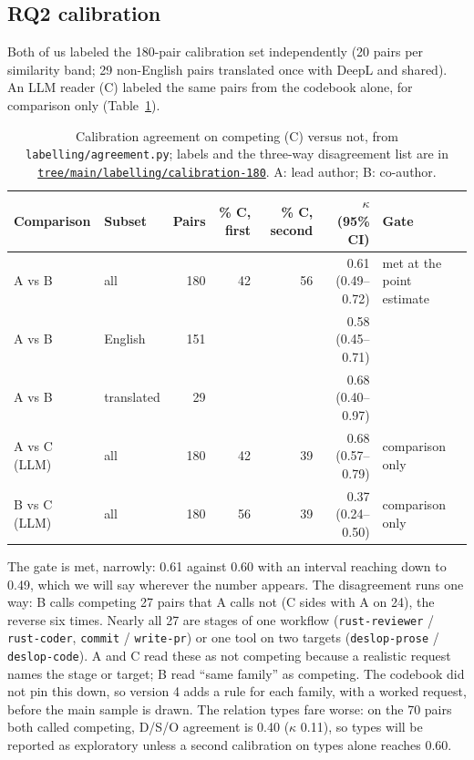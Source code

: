 \documentclass[10pt]{article}
\newcommand{\repo}[1]{\href{https://github.com/Naalu/agent-skill-conflicts/#1}{\texttt{#1}}}
\begin{document}
\subsection{RQ2 calibration}
Both of us labeled the 180-pair calibration set independently (20 pairs per similarity band; 29 non-English pairs
translated once with DeepL and shared). An LLM reader (C) labeled the same pairs from the codebook alone, for comparison
only (Table~\ref{tab:kappa}).

\begin{table}[h]
\centering\small
\begin{tabular}{llrrrrl}
\toprule
Comparison & Subset & Pairs & \% C, first & \% C, second & $\kappa$ (95\% CI) & Gate \\
\midrule
A vs B & all & 180 & 42 & 56 & 0.61 (0.49--0.72) & met at the point estimate \\
A vs B & English & 151 & & & 0.58 (0.45--0.71) & \\
A vs B & translated & 29 & & & 0.68 (0.40--0.97) & \\
A vs C (LLM) & all & 180 & 42 & 39 & 0.68 (0.57--0.79) & comparison only \\
B vs C (LLM) & all & 180 & 56 & 39 & 0.37 (0.24--0.50) & comparison only \\
\bottomrule
\end{tabular}
\caption{Calibration agreement on competing (C) versus not, from \texttt{labelling/agreement.py}; labels and the
three-way disagreement list are in \repo{tree/main/labelling/calibration-180}. A: lead author; B: co-author.}
\label{tab:kappa}
\end{table}

The gate is met, narrowly: 0.61 against 0.60 with an interval reaching down to 0.49, which we will say wherever the
number appears. The disagreement runs one way: B calls competing 27 pairs that A calls not (C sides with A on 24), the
reverse six times. Nearly all 27 are stages of one workflow (\texttt{rust-reviewer} / \texttt{rust-coder},
\texttt{commit} / \texttt{write-pr}) or one tool on two targets (\texttt{deslop-prose} / \texttt{deslop-code}). A and C read
these as not competing because a realistic request names the stage or target; B read ``same family'' as competing. The
codebook did not pin this down, so version 4 adds a rule for each family, with a worked request, before the main sample
is drawn. The relation types fare worse: on the 70 pairs both called competing, D/S/O agreement is 0.40 ($\kappa$ 0.11),
so types will be reported as exploratory unless a second calibration on types alone reaches 0.60.
\end{document}
